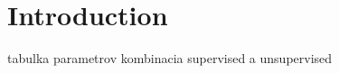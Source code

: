 \chapter*{Introduction}
\* %
\* %

{}
\* %

\* %
\* %
\* %


{}
\* %


{}
\* %
tabulka parametrov
\* kombinacia supervised a unsupervised

        
        
{}


{}


{}
\* %

\* %
